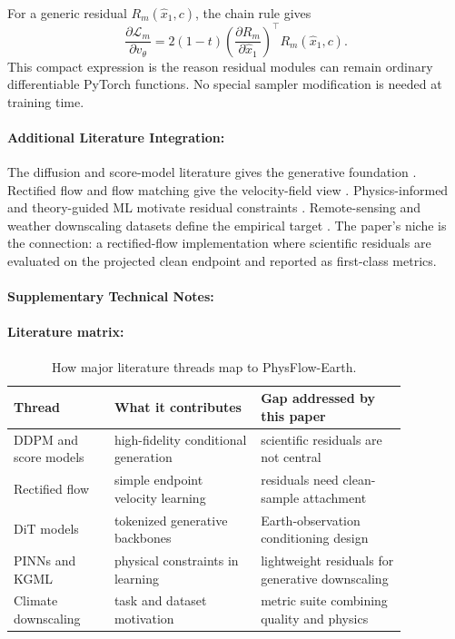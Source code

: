 \documentclass{article}
\begin{document}
For a generic residual $R_m(\hat{x}_1,c)$, the chain rule gives
\begin{equation}
  \frac{\partial \mathcal{L}_{m}}{\partial v_{\theta}}
  =2(1-t)\left(\frac{\partial R_m}{\partial \hat{x}_1}\right)^\top R_m(\hat{x}_1,c).
\end{equation}
This compact expression is the reason residual modules can remain ordinary differentiable PyTorch functions. No special sampler modification is needed at training time.

\paragraph{Additional Literature Integration:}

The diffusion and score-model literature gives the generative foundation \citep{ho2020denoising,song2021score,saharia2022image}. Rectified flow and flow matching give the velocity-field view \citep{liu2022rectified,lipman2023flow}. Physics-informed and theory-guided ML motivate residual constraints \citep{raissi2019physics,karpatne2017theory}. Remote-sensing and weather downscaling datasets define the empirical target \citep{cornebise2022worldstrat,michel2022sen2venus,mardani2023corrdiff,leinonen2023precipitation}. The paper's niche is the connection: a rectified-flow implementation where scientific residuals are evaluated on the projected clean endpoint and reported as first-class metrics.

\paragraph{Supplementary Technical Notes:}

\paragraph{Literature matrix:}

\begin{table}[t]
\centering
\caption{How major literature threads map to PhysFlow-Earth.}
\begin{tabular}{@{}p{0.22\linewidth}p{0.32\linewidth}p{0.32\linewidth}@{}}
\toprule
\textbf{Thread} & \textbf{What it contributes} & \textbf{Gap addressed by this paper}\\
\midrule
DDPM and score models & high-fidelity conditional generation & scientific residuals are not central\\
Rectified flow & simple endpoint velocity learning & residuals need clean-sample attachment\\
DiT models & tokenized generative backbones & Earth-observation conditioning design\\
PINNs and KGML & physical constraints in learning & lightweight residuals for generative downscaling\\
Climate downscaling & task and dataset motivation & metric suite combining quality and physics\\
\bottomrule
\end{tabular}
\end{table}
\end{document}
